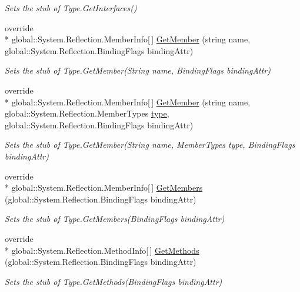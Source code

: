 \begin{DoxyCompactItemize}
\begin{DoxyCompactList}\small\item\em Sets the stub of Type.\-Get\-Interfaces()\end{DoxyCompactList}\item 
override \\*
global\-::\-System.\-Reflection.\-Member\-Info\mbox{[}$\,$\mbox{]} \hyperlink{class_system_1_1_fakes_1_1_stub_type_af208c62e1f7a80a86514ff08e5d2f102}{Get\-Member} (string name, global\-::\-System.\-Reflection.\-Binding\-Flags binding\-Attr)
\begin{DoxyCompactList}\small\item\em Sets the stub of Type.\-Get\-Member(\-String name, Binding\-Flags binding\-Attr)\end{DoxyCompactList}\item 
override \\*
global\-::\-System.\-Reflection.\-Member\-Info\mbox{[}$\,$\mbox{]} \hyperlink{class_system_1_1_fakes_1_1_stub_type_a5169e67c6785c5aae7a748919cb958ab}{Get\-Member} (string name, global\-::\-System.\-Reflection.\-Member\-Types \hyperlink{jquery-1_810_82-vsdoc_8js_a3940565e83a9bfd10d95ffd27536da91}{type}, global\-::\-System.\-Reflection.\-Binding\-Flags binding\-Attr)
\begin{DoxyCompactList}\small\item\em Sets the stub of Type.\-Get\-Member(\-String name, Member\-Types type, Binding\-Flags binding\-Attr)\end{DoxyCompactList}\item 
override \\*
global\-::\-System.\-Reflection.\-Member\-Info\mbox{[}$\,$\mbox{]} \hyperlink{class_system_1_1_fakes_1_1_stub_type_ad452da668d873a2bbfc7e390ada3e26e}{Get\-Members} (global\-::\-System.\-Reflection.\-Binding\-Flags binding\-Attr)
\begin{DoxyCompactList}\small\item\em Sets the stub of Type.\-Get\-Members(\-Binding\-Flags binding\-Attr)\end{DoxyCompactList}\item 
override \\*
global\-::\-System.\-Reflection.\-Method\-Info\mbox{[}$\,$\mbox{]} \hyperlink{class_system_1_1_fakes_1_1_stub_type_a4e7bf22c6232ae16da312094f6577faf}{Get\-Methods} (global\-::\-System.\-Reflection.\-Binding\-Flags binding\-Attr)
\begin{DoxyCompactList}\small\item\em Sets the stub of Type.\-Get\-Methods(\-Binding\-Flags binding\-Attr)\end{DoxyCompactList}\item 

\end{DoxyCompactItemize}
